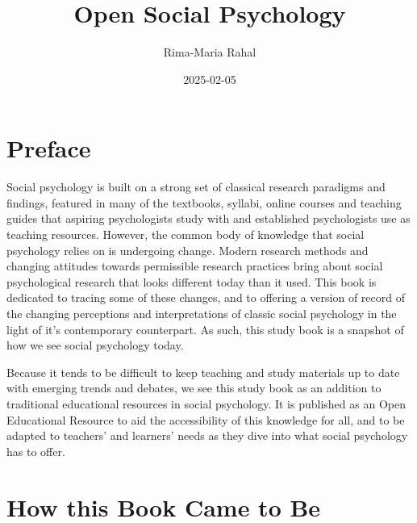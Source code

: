 \documentclass[
  letterpaper,
]{book}
\title{Open Social Psychology}
\author{Rima-Maria Rahal}
\date{2025-02-05}
\renewcommand*\contentsname{Table of contents}
\newcommand\contentsname{Table of contents}
\begin{document}
\frontmatter
\maketitle

\renewcommand*\contentsname{Table of contents}
{
\hypersetup{linkcolor=}
\setcounter{tocdepth}{2}
\tableofcontents
}
\mainmatter
{}

\chapter*{\texorpdfstring{{Preface}}{Preface}}\label{preface}


Social psychology is built on a strong set of classical research
paradigms and findings, featured in many of the textbooks, syllabi,
online courses and teaching guides that aspiring psychologists study
with and established psychologists use as teaching resources. However,
the common body of knowledge that social psychology relies on is
undergoing change. Modern research methods and changing attitudes
towards permissible research practices bring about social psychological
research that looks different today than it used. This book is dedicated
to tracing some of these changes, and to offering a version of record of
the changing perceptions and interpretations of classic social
psychology in the light of it's contemporary counterpart. As such, this
study book is a snapshot of how we see social psychology today.

Because it tends to be difficult to keep teaching and study materials up
to date with emerging trends and debates, we see this study book as an
addition to traditional educational resources in social psychology. It
is published as an Open Educational Resource to aid the accessibility of
this knowledge for all, and to be adapted to teachers' and learners'
needs as they dive into what social psychology has to offer.


\chapter*{\texorpdfstring{{How this Book Came to
Be}}{How this Book Came to Be}}\label{how-this-book-came-to-be}

\end{document}
